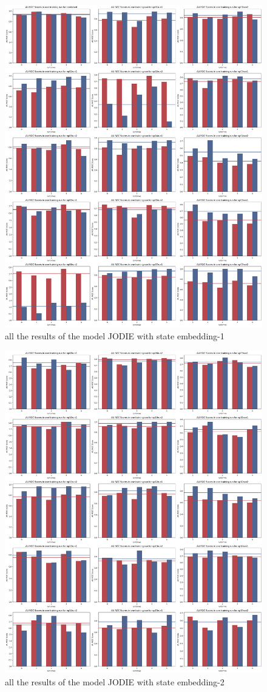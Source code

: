 \begin{figure}
    \centering
    \includegraphics[width=\textwidth]{figures/05_all_results1.png}
    \caption{all the results of the model JODIE with state embedding-1} 
    \label{fig:all_results1}
\end{figure}

\begin{figure}
    \centering
    \includegraphics[width=\textwidth]{figures/05_all_results2.png}
    \caption{all the results of the model JODIE with state embedding-2} 
    \label{fig:all_results2}
\end{figure}
